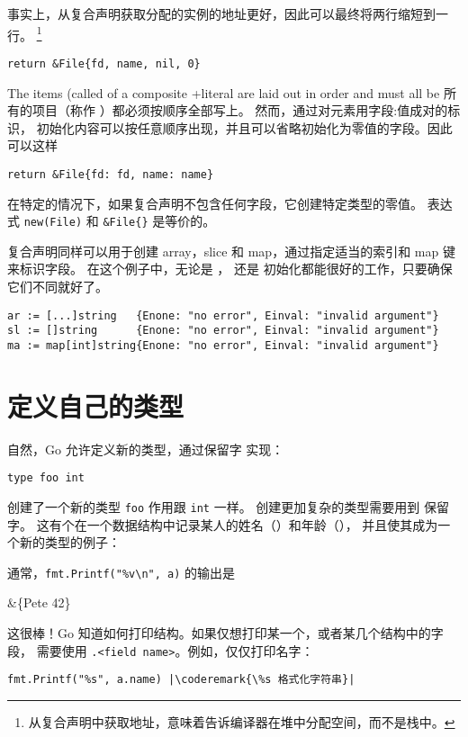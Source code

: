 事实上，从复合声明获取分配的实例的地址更好，因此可以最终将两行缩短到一行。
\footnote{从复合声明中获取地址，意味着告诉编译器在堆中分配空间，而不是栈中。}
\begin{lstlisting}
return &File{fd, name, nil, 0}
\end{lstlisting}
The items (called  of a composite 
+literal are laid out in order and must all be
所有的项目（称作 ）都必须按顺序全部写上。
然而，通过对元素用字段:值成对的标识，
初始化内容可以按任意顺序出现，并且可以省略初始化为零值的字段。因此可以这样

\begin{lstlisting}
return &File{fd: fd, name: name}
\end{lstlisting}
在特定的情况下，如果复合声明不包含任何字段，它创建特定类型的零值。
表达式 \lstinline{new(File)} 和 \lstinline|&File{}| 是等价的。

复合声明同样可以用于创建 array，slice 和 map，通过指定适当的索引和 map 键来标识字段。
在这个例子中，无论是 ， 还是  初始化都能很好的工作，只要确保它们不同就好了。
\begin{lstlisting}
ar := [...]string   {Enone: "no error", Einval: "invalid argument"}
sl := []string      {Enone: "no error", Einval: "invalid argument"}
ma := map[int]string{Enone: "no error", Einval: "invalid argument"}
\end{lstlisting}

\section{定义自己的类型}
\label{sec:defining your own}
自然，Go 允许定义新的类型，通过保留字
 实现： 
\begin{lstlisting}
type foo int
\end{lstlisting}
创建了一个新的类型 \lstinline{foo} 作用跟 \lstinline{int} 一样。
创建更加复杂的类型需要用到  保留字。
这有个在一个数据结构中记录某人的姓名（）和年龄（），
并且使其成为一个新的类型的例子：

通常，\lstinline{fmt.Printf("%v\n", a)} 的输出是
\begin{display}
&\{Pete 42\}
\end{display}
这很棒！Go 知道如何打印结构。如果仅想打印某一个，或者某几个结构中的字段，
需要使用 \verb|.<field name>|。例如，仅仅打印名字：
\begin{lstlisting}
fmt.Printf("%s", a.name) |\coderemark{\%s 格式化字符串}|
\end{lstlisting}

